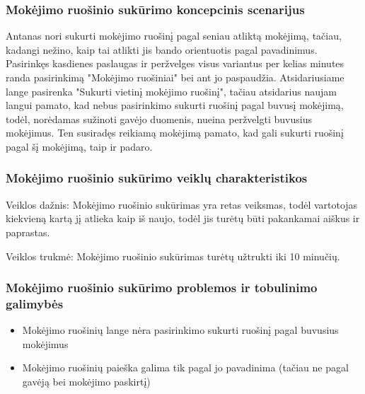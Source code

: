 \documentclass{VUMIFPSkursinis}
\begin{document}
\subsubsection{Mokėjimo ruošinio sukūrimo koncepcinis scenarijus}
Antanas nori sukurti mokėjimo ruošinį pagal seniau atliktą mokėjimą, tačiau, kadangi nežino, kaip tai atlikti jis bando orientuotis pagal pavadinimus. Pasirinkęs kasdienes paslaugas ir peržvelges visus variantus per kelias minutes randa pasirinkimą "Mokėjimo ruošiniai" bei ant jo paspaudžia. Atsidariusiame lange pasirenka "Sukurti vietinį mokėjimo ruošinį", tačiau atsidarius naujam langui pamato, kad nebus pasirinkimo sukurti ruošinį pagal buvusį mokėjimą, todėl, norėdamas sužinoti gavėjo duomenis, nueina peržvelgti buvusius mokėjimus. Ten susiradęs reikiamą mokėjimą pamato, kad gali sukurti ruošinį pagal šį mokėjimą, taip ir padaro.
\subsubsection{Mokėjimo ruošinio sukūrimo veiklų charakteristikos}
Veiklos dažnis: Mokėjimo ruošinio sukūrimas yra retas veiksmas, todėl vartotojas kiekvieną kartą jį atlieka kaip iš naujo, todėl jis turėtų būti pakankamai aiškus ir paprastas. \par
Veiklos trukmė: Mokėjimo ruošinio sukūrimas turėtų užtrukti iki 10 minučių.
\subsubsection{Mokėjimo ruošinio sukūrimo problemos ir tobulinimo galimybės}
\begin{itemize}
	\item Mokėjimo ruošinių lange nėra pasirinkimo sukurti ruošinį pagal buvusius mokėjimus
	\item Mokėjimo ruošinių paieška galima tik pagal jo pavadinima (tačiau ne pagal gavėją bei mokėjimo paskirtį)
\end{itemize}
\end{document}
